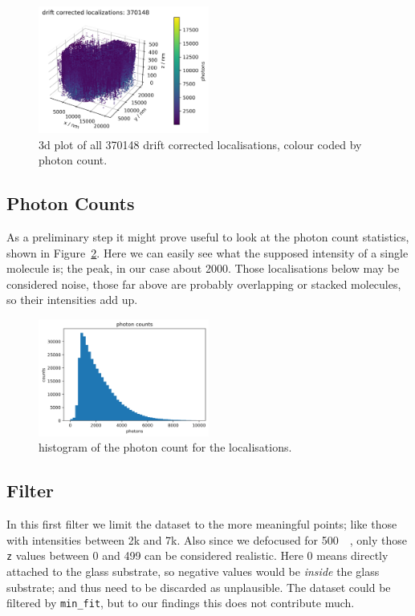 \documentclass[11pt, a4paper, oneside, twocolumn]{report}
\renewcommand{\tt}{\texttt}
\newcommand{\e}{\emph}
\newcommand{\m}{\mathrm}
\begin{document}
\begin{figure}[h]
  \centering
  \includegraphics[width=0.5\textwidth]{2_drift.png}
  \caption{3d plot of all 370148 drift corrected localisations, colour
    coded by photon count.}
  \label{f:2_drift}
\end{figure}


\subsection{Photon Counts}

As a preliminary step it might prove useful to look at the photon
count statistics, shown in Figure~\ref{f:3_photons}. Here we can
easily see what the supposed intensity of a single molecule is; the
peak, in our case about 2000. Those localisations below may be
considered noise, those far above are probably overlapping or stacked
molecules, so their intensities add up.

\begin{figure}[h!]
  \centering
  \includegraphics[width=0.5\textwidth]{3_photons.png}
  \caption{histogram of the photon count for the localisations.}
  \label{f:3_photons}
\end{figure}


\subsection{Filter}

In this first filter we limit the dataset to the more meaningful
points; like those with intensities between 2k and 7k. Also since we
defocused for \SI{500}{\nano\m}, only those \tt{z} values between 0 and
499 can be considered realistic. Here 0 means directly attached to the
glass substrate, so negative values would be \e{inside} the glass
substrate; and thus need to be discarded as unplausible. The dataset
could be filtered by \tt{min\_fit}, but to our findings this does not
contribute much.
\end{document}
